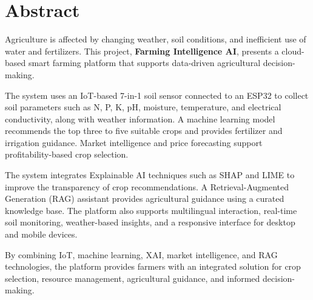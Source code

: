 \chapter*{Abstract}

Agriculture is affected by changing weather, soil conditions, and inefficient use of water and fertilizers. This project, \textbf{Farming Intelligence AI}, presents a cloud-based smart farming platform that supports data-driven agricultural decision-making.

The system uses an IoT-based 7-in-1 soil sensor connected to an ESP32 to collect soil parameters such as N, P, K, pH, moisture, temperature, and electrical conductivity, along with weather information. A machine learning model recommends the top three to five suitable crops and provides fertilizer and irrigation guidance. Market intelligence and price forecasting support profitability-based crop selection.

The system integrates Explainable AI techniques such as SHAP and LIME to improve the transparency of crop recommendations. A Retrieval-Augmented Generation (RAG) assistant provides agricultural guidance using a curated knowledge base. The platform also supports multilingual interaction, real-time soil monitoring, weather-based insights, and a responsive interface for desktop and mobile devices.

By combining IoT, machine learning, XAI, market intelligence, and RAG technologies, the platform provides farmers with an integrated solution for crop selection, resource management, agricultural guidance, and informed decision-making.